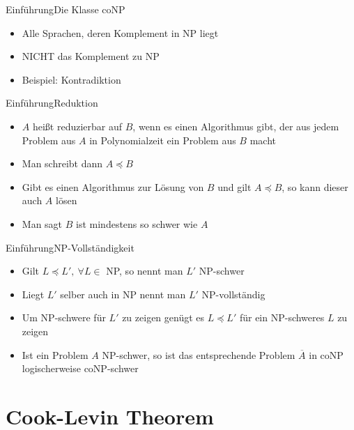 \documentclass[ignorenonframetext,]{beamer}
\begin{document}
\begin{frame}{Einführung}{Die Klasse coNP}

\begin{itemize}
\itemsep1pt\parskip0pt
\item
  Alle Sprachen, deren Komplement in NP liegt
\item
  NICHT das Komplement zu NP
\item
  Beispiel: Kontradiktion
\end{itemize}

\end{frame}

\begin{frame}{Einführung}{Reduktion}

\begin{itemize}
\itemsep1pt\parskip0pt
\item
  $A$ heißt reduzierbar auf $B$, wenn es einen Algorithmus gibt, der aus
  jedem Problem aus $A$ in Polynomialzeit ein Problem aus $B$ macht
\item
  Man schreibt dann $A \preceq B$
\item
  Gibt es einen Algorithmus zur Lösung von $B$ und gilt $A \preceq B$,
  so kann dieser auch $A$ lösen
\item
  Man sagt $B$ ist mindestens so schwer wie $A$
\end{itemize}

\end{frame}

\begin{frame}{Einführung}{NP-Vollständigkeit}

\begin{itemize}
\itemsep1pt\parskip0pt
\item
  Gilt $L \preceq L',\ \forall L \in$ NP, so nennt man $L'$ NP-schwer
\item
  Liegt $L'$ selber auch in NP nennt man $L'$ NP-vollständig
\item
  Um NP-schwere für $L'$ zu zeigen genügt es $L \preceq L'$ für ein
  NP-schweres $L$ zu zeigen
\item
  Ist ein Problem $A$ NP-schwer, so ist das entsprechende Problem
  $\overline{A}$ in coNP logischerweise coNP-schwer
\end{itemize}

\end{frame}

\section{Cook-Levin Theorem}\label{cook-levin-theorem}
\end{document}
